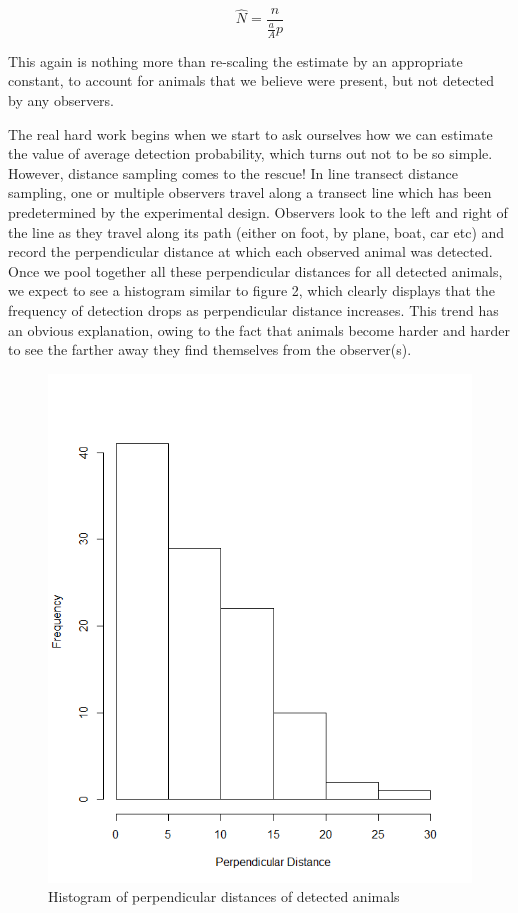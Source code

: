 \documentclass[11pt]{article}
\begin{document}
\begin{multicols}{2}
\begin{equation}
\hat{N}=\frac{n}{\frac{a}{A}p}
\end{equation} 


This again is nothing more than re-scaling the estimate by an appropriate constant, to account for animals that we believe were present, but not detected by any observers. 


The real hard work begins when we start to ask ourselves how we can estimate the value of average detection probability, which turns out not to be so simple. However, distance sampling comes to the rescue!  In line transect distance sampling, one or multiple observers travel along a transect line which has been predetermined by the experimental design. Observers look to the left and right of the line as they travel along its path (either on foot, by plane, boat, car etc) and record the perpendicular distance at which each observed animal was detected. Once we pool together all these perpendicular distances for all detected animals, we expect to see a histogram similar to figure 2, which clearly displays that the frequency of detection drops as perpendicular distance increases. This trend has an obvious explanation, owing to the fact that animals become harder and harder to see the farther away they find themselves from the observer(s).

\begin{figure}[H]
\includegraphics[scale=0.5]{DistanceHist}
\caption{Histogram of perpendicular distances of detected animals}
\end{figure}



\end{multicols}
\end{document}
